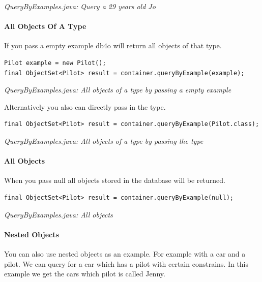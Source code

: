 {\small\itshape QueryByExamples.java: Query a 29 years old Jo\par}
\medskip

\paragraph{All Objects Of A Type}
\label{ref:basics-querying-query-by-example-qby-examples:allofatype}

If you pass a empty example db4o will return all objects of that type.

\begin{lstlisting}
Pilot example = new Pilot();
final ObjectSet<Pilot> result = container.queryByExample(example);
\end{lstlisting}

{\small\itshape QueryByExamples.java: All objects of a type by passing a empty example\par}
\medskip

Alternatively you also can directly pass in the type.

\begin{lstlisting}
final ObjectSet<Pilot> result = container.queryByExample(Pilot.class);
\end{lstlisting}

{\small\itshape QueryByExamples.java: All objects of a type by passing the type\par}
\medskip

\paragraph{All Objects}
\label{ref:basics-querying-query-by-example-qby-examples:allobjects}

When you pass null all objects stored in the database will be returned.

\begin{lstlisting}
final ObjectSet<Pilot> result = container.queryByExample(null);
\end{lstlisting}

{\small\itshape QueryByExamples.java: All objects\par}
\medskip

\paragraph{Nested Objects}
\label{ref:basics-querying-query-by-example-qby-examples:nestedobjects}

You can also use nested objects as an example. For example with a car and a pilot. We can query for a car which has a pilot with certain constrains. In this example we get the cars which pilot is called Jenny.

